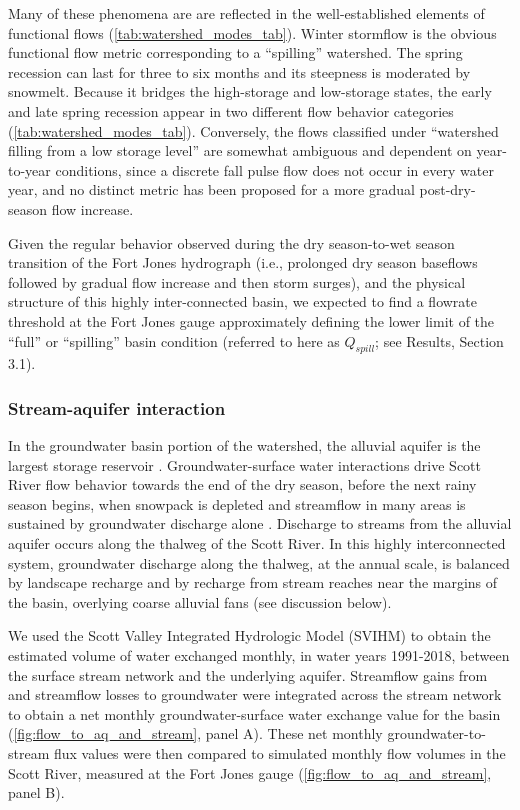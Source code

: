 \documentclass[hess, manuscript]{copernicus}
\begin{document}
Many of these phenomena are are reflected in the well-established
elements of functional flows (\autoref{tab:watershed_modes_tab}). Winter
stormflow is the obvious functional flow metric corresponding to a
``spilling'' watershed. The spring recession can last for three to six
months and its steepness is moderated by snowmelt. Because it bridges
the high-storage and low-storage states, the early and late spring
recession appear in two different flow behavior categories
(\autoref{tab:watershed_modes_tab}). Conversely, the flows classified
under ``watershed filling from a low storage level'' are somewhat
ambiguous and dependent on year-to-year conditions, since a discrete
fall pulse flow does not occur in every water year, and no distinct
metric has been proposed for a more gradual post-dry-season flow
increase.

Given the regular behavior observed during the dry season-to-wet season
transition of the Fort Jones hydrograph (i.e., prolonged dry season
baseflows followed by gradual flow increase and then storm surges), and
the physical structure of this highly inter-connected basin, we expected
to find a flowrate threshold at the Fort Jones gauge approximately
defining the lower limit of the ``full'' or ``spilling'' basin condition
(referred to here as \(Q_{spill}\); see Results, Section 3.1).

\subsubsection{Stream-aquifer interaction}

In the groundwater basin portion of the watershed, the alluvial aquifer
is the largest storage reservoir \citep{Mack1958}. Groundwater-surface
water interactions drive Scott River flow behavior towards the end of
the dry season, before the next rainy season begins, when snowpack is
depleted and streamflow in many areas is sustained by groundwater
discharge alone \citep{Foglia2018a}. Discharge to streams from the
alluvial aquifer occurs along the thalweg of the Scott River. In this
highly interconnected system, groundwater discharge along the thalweg,
at the annual scale, is balanced by landscape recharge and by recharge
from stream reaches near the margins of the basin, overlying coarse
alluvial fans (see discussion below).

We used the Scott Valley Integrated Hydrologic Model (SVIHM)
\citep{Tolley2019, Foglia2013a, Foglia2013b} to obtain the estimated
volume of water exchanged monthly, in water years 1991-2018, between the
surface stream network and the underlying aquifer. Streamflow gains from
and streamflow losses to groundwater were integrated across the stream
network to obtain a net monthly groundwater-surface water exchange value
for the basin (\autoref{fig:flow_to_aq_and_stream}, panel A). These net
monthly groundwater-to-stream flux values were then compared to
simulated monthly flow volumes in the Scott River, measured at the Fort
Jones gauge (\autoref{fig:flow_to_aq_and_stream}, panel B).
\end{document}
